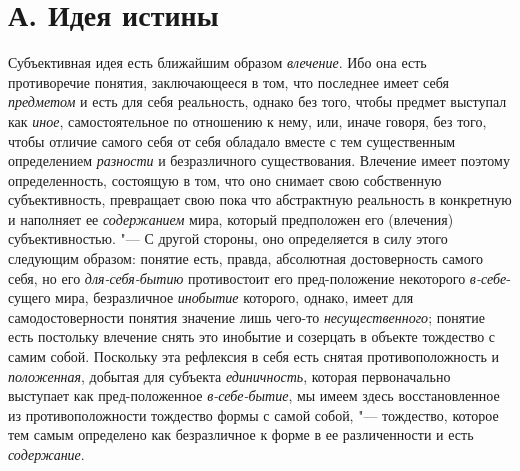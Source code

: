 \section[А. Идея истины]{А. Идея истины}
Субъективная идея есть ближайшим образом
{\em влечение}. Ибо она
есть противоречие понятия, заключающееся в том, что последнее имеет себя
{\em предметом} и есть
для себя реальность, однако без того, чтобы предмет выступал как {\em иное},
самостоятельное по отношению к нему, или, иначе говоря, без
того, чтобы отличие самого себя от себя обладало вместе с тем существенным
определением {\em разности}
и безразличного существования. Влечение имеет поэтому
определенность, состоящую в том, что оно снимает свою собственную
субъективность, превращает свою пока что абстрактную реальность в
конкретную и наполняет ее
{\em содержанием} мира,
который предположен его (влечения) субъективностью. "--- С
другой стороны, оно определяется в силу этого следующим образом: понятие
есть, правда, абсолютная достоверность самого себя, но его
{\em для-себя-бытию}
противостоит его пред-положение некоторого
{\em в-себе}{}-сущего
мира, безразличное {\em инобытие}
которого, однако, имеет для самодостоверности понятия
значение лишь чего-то
{\em несущественного};
понятие есть постольку влечение снять это инобытие и
созерцать в объекте тождество с самим собой. Поскольку эта рефлексия в себя
есть снятая противоположность и
{\em положенная}, добытая
для субъекта {\em единичность},
которая первоначально выступает как пред-положенное
{\em в-себе-бытие}, мы
имеем здесь восстановленное из противоположности тождество формы с самой
собой, "--- тождество, которое тем самым
определено как безразличное к форме в ее различенности и
есть {\em содержание}.

